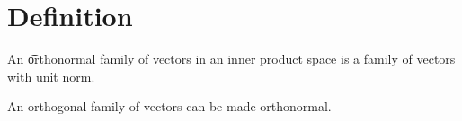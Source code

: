 
\section*{Definition}

An \t{orthonormal family of vectors} in an inner product space is a family of vectors with unit norm.

\begin{proposition}
An orthogonal family of vectors can be made orthonormal.
\end{proposition}

\blankpage
